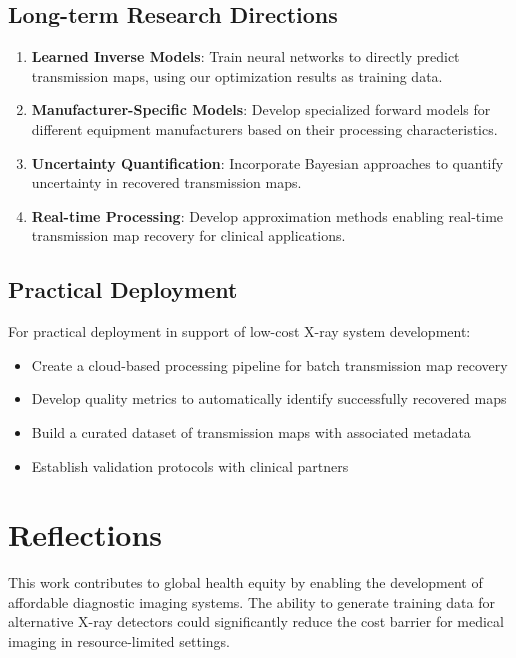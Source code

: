 \documentclass[nomenclature, english, bibtex]{kththesis}
\numberwithin{listing}{chapter}
\begin{document}
\subsection{Long-term Research Directions}
\begin{enumerate}
    \item \textbf{Learned Inverse Models}: Train neural networks to directly predict transmission maps, using our optimization results as training data.

    \item \textbf{Manufacturer-Specific Models}: Develop specialized forward models for different equipment manufacturers based on their processing characteristics.

    \item \textbf{Uncertainty Quantification}: Incorporate Bayesian approaches to quantify uncertainty in recovered transmission maps.

    \item \textbf{Real-time Processing}: Develop approximation methods enabling real-time transmission map recovery for clinical applications.
\end{enumerate}

\subsection{Practical Deployment}
For practical deployment in support of low-cost X-ray system development:
\begin{itemize}
    \item Create a cloud-based processing pipeline for batch transmission map recovery
    \item Develop quality metrics to automatically identify successfully recovered maps
    \item Build a curated dataset of transmission maps with associated metadata
    \item Establish validation protocols with clinical partners
\end{itemize}

\section{Reflections}
\label{sec:reflections}

This work contributes to global health equity by enabling the development of affordable diagnostic imaging systems. The ability to generate training data for alternative X-ray detectors could significantly reduce the cost barrier for medical imaging in resource-limited settings.
\end{document}
